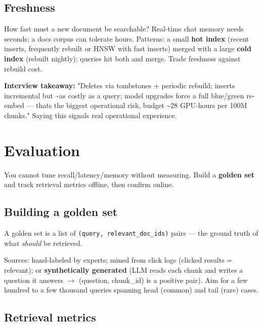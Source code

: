 \documentclass[11pt]{article}
\begin{document}
\subsection{Freshness}\label{freshness}

How fast must a new document be searchable? Real-time chat memory needs seconds; a docs corpus can tolerate hours. Patterns: a small \textbf{hot index} (recent inserts, frequently rebuilt or HNSW with fast inserts) merged with a large \textbf{cold index} (rebuilt nightly); queries hit both and merge. Trade freshness against rebuild cost.

\textbf{Interview takeaway:} "Deletes via tombstones + periodic rebuild; inserts incremental but \textasciitilde as costly as a query; model upgrades force a full blue/green re-embed --- that\textquotesingle s the biggest operational risk, budget \textasciitilde28 GPU-hours per 100M chunks." Saying this signals real operational experience.

\section{Evaluation}\label{evaluation}

You cannot tune recall/latency/memory without measuring. Build a \textbf{golden set} and track retrieval metrics offline, then confirm online.

\subsection{Building a golden set}\label{building-a-golden-set}

A golden set is a list of \texttt{(query,\ relevant\_doc\_ids)} pairs --- the ground truth of what \emph{should} be retrieved.

Sources: hand-labeled by experts; mined from click logs (clicked results = relevant); or \textbf{synthetically generated} (LLM reads each chunk and writes a question it answers \(\rightarrow\) (question, chunk\_id) is a positive pair). Aim for a few hundred to a few thousand queries spanning head (common) and tail (rare) cases.

\subsection{Retrieval metrics}\label{retrieval-metrics}
\end{document}
